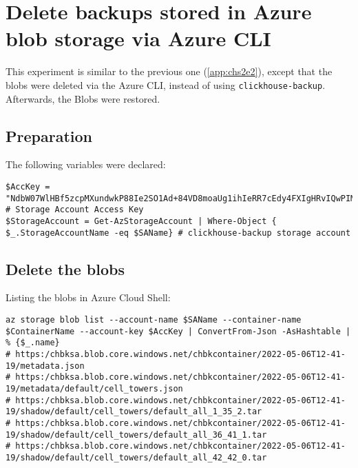 \section{Delete backups stored in Azure blob storage via Azure CLI}
\label{app:chs2e3}
This experiment is similar to the previous one (\ref{app:chs2e2}),
except that the blobs were deleted via the Azure CLI,
instead of using \texttt{clickhouse-backup}.
Afterwards, the Blobs were restored.

\subsection{Preparation}
\label{sec:org4d48e1c}
The following variables were declared:
\begin{verbatim}
$AccKey = "NdbW07WlHBf5zcpMXundwkP88Ie2SO1Ad+84VD8moaUg1ihIeRR7cEdy4FXIgHRvIQwPIMc7eD2q+ASt6EqxWg==" # Storage Account Access Key
$StorageAccount = Get-AzStorageAccount | Where-Object { $_.StorageAccountName -eq $SAName} # clickhouse-backup storage account
\end{verbatim}

\subsection{Delete the blobs}
\label{sec:orge72cc5d}
Listing the blobs in Azure Cloud Shell:
\begin{verbatim}
az storage blob list --account-name $SAName --container-name $ContainerName --account-key $AccKey | ConvertFrom-Json -AsHashtable | % {$_.name}
# https:/chbksa.blob.core.windows.net/chbkcontainer/2022-05-06T12-41-19/metadata.json
# https:/chbksa.blob.core.windows.net/chbkcontainer/2022-05-06T12-41-19/metadata/default/cell_towers.json
# https:/chbksa.blob.core.windows.net/chbkcontainer/2022-05-06T12-41-19/shadow/default/cell_towers/default_all_1_35_2.tar
# https:/chbksa.blob.core.windows.net/chbkcontainer/2022-05-06T12-41-19/shadow/default/cell_towers/default_all_36_41_1.tar
# https:/chbksa.blob.core.windows.net/chbkcontainer/2022-05-06T12-41-19/shadow/default/cell_towers/default_all_42_42_0.tar
\end{verbatim}

